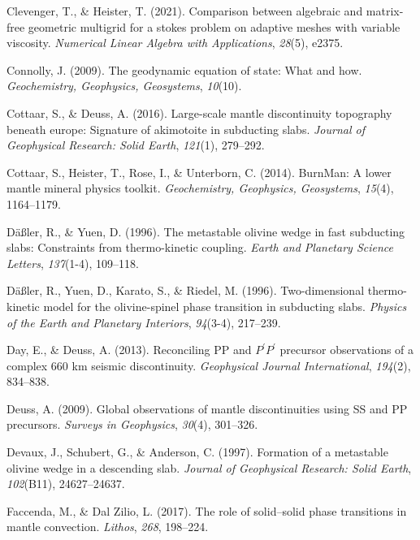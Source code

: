 \documentclass[draft,linenumbers]{agujournal2019}
\newlength{\cslhangindent}
\newenvironment{CSLReferences}[2]
 {\begin{list}{}{
  \setlength{\itemindent}{0pt}
  \setlength{\leftmargin}{0pt}
  \setlength{\parsep}{0pt}
  \ifodd #1
   \setlength{\leftmargin}{\cslhangindent}
   \setlength{\itemindent}{-\cslhangindent}
  \fi
  \setlength{\itemsep}{#2\baselineskip}
  }
  \item\relax}
 {\end{list}}
\begin{document}
\begin{CSLReferences}{1}{0}
Clevenger, T., \& Heister, T. (2021). Comparison between algebraic and
matrix-free geometric multigrid for a stokes problem on adaptive meshes
with variable viscosity. \emph{Numerical Linear Algebra with
Applications}, \emph{28}(5), e2375.

Connolly, J. (2009). The geodynamic equation of state: What and how.
\emph{Geochemistry, Geophysics, Geosystems}, \emph{10}(10).

Cottaar, S., \& Deuss, A. (2016). Large-scale mantle discontinuity
topography beneath europe: Signature of akimotoite in subducting slabs.
\emph{Journal of Geophysical Research: Solid Earth}, \emph{121}(1),
279--292.

Cottaar, S., Heister, T., Rose, I., \& Unterborn, C. (2014). BurnMan: A
lower mantle mineral physics toolkit. \emph{Geochemistry, Geophysics,
Geosystems}, \emph{15}(4), 1164--1179.

Däßler, R., \& Yuen, D. (1996). The metastable olivine wedge in fast
subducting slabs: Constraints from thermo-kinetic coupling. \emph{Earth
and Planetary Science Letters}, \emph{137}(1-4), 109--118.

Däßler, R., Yuen, D., Karato, S., \& Riedel, M. (1996). Two-dimensional
thermo-kinetic model for the olivine-spinel phase transition in
subducting slabs. \emph{Physics of the Earth and Planetary Interiors},
\emph{94}(3-4), 217--239.

Day, E., \& Deuss, A. (2013). Reconciling PP and {\(P^\prime P^\prime\)}
precursor observations of a complex 660 km seismic discontinuity.
\emph{Geophysical Journal International}, \emph{194}(2), 834--838.

Deuss, A. (2009). Global observations of mantle discontinuities using SS
and PP precursors. \emph{Surveys in Geophysics}, \emph{30}(4), 301--326.

Devaux, J., Schubert, G., \& Anderson, C. (1997). Formation of a
metastable olivine wedge in a descending slab. \emph{Journal of
Geophysical Research: Solid Earth}, \emph{102}(B11), 24627--24637.

Faccenda, M., \& Dal Zilio, L. (2017). The role of solid--solid phase
transitions in mantle convection. \emph{Lithos}, \emph{268}, 198--224.


\end{CSLReferences}
\end{document}
